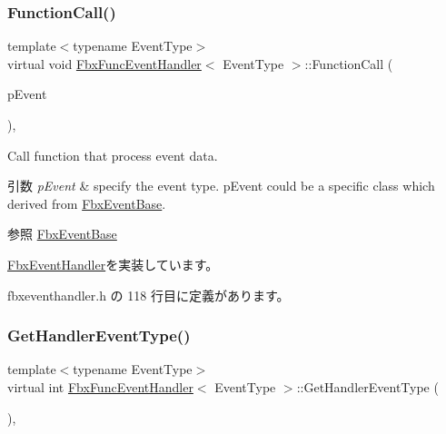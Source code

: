 \subsubsection{\texorpdfstring{Function\+Call()}{FunctionCall()}}
{\footnotesize\ttfamily template$<$typename Event\+Type$>$ \\
virtual void \hyperlink{class_fbx_func_event_handler}{Fbx\+Func\+Event\+Handler}$<$ Event\+Type $>$\+::Function\+Call (\begin{DoxyParamCaption}\item[{const \hyperlink{class_fbx_event_base}{Fbx\+Event\+Base} \&}]{p\+Event }\end{DoxyParamCaption})\hspace{0.3cm}{\ttfamily [inline]}, {\ttfamily [virtual]}}

Call function that process event data. 
\begin{DoxyParams}{引数}
{\em p\+Event} & specify the event type. p\+Event could be a specific class which derived from \hyperlink{class_fbx_event_base}{Fbx\+Event\+Base}. \\
\hline
\end{DoxyParams}
\begin{DoxySeeAlso}{参照}
\hyperlink{class_fbx_event_base}{Fbx\+Event\+Base} 
\end{DoxySeeAlso}


\hyperlink{class_fbx_event_handler_a46357ba45116a30c8f53c3e5fe9ba2fb}{Fbx\+Event\+Handler}を実装しています。



 fbxeventhandler.\+h の 118 行目に定義があります。

\mbox{\label{class_fbx_func_event_handler_a0c1a0eaedda70615a684bd96aa72fb97}} 
\subsubsection{\texorpdfstring{Get\+Handler\+Event\+Type()}{GetHandlerEventType()}}
{\footnotesize\ttfamily template$<$typename Event\+Type$>$ \\
virtual int \hyperlink{class_fbx_func_event_handler}{Fbx\+Func\+Event\+Handler}$<$ Event\+Type $>$\+::Get\+Handler\+Event\+Type (\begin{DoxyParamCaption}{ }\end{DoxyParamCaption})\hspace{0.3cm}{\ttfamily [inline]}, {\ttfamily [virtual]}}

